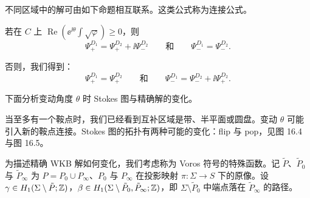 不同区域中的解可由如下命题相互联系。这类公式称为连接公式。

\begin{proposition}[16.21（{{[216, Thm. 2.25]}}）] 若在 $C$ 上 $\operatorname{Re}\left(\ee^{\ii\theta}\int\sqrt{\varphi}\right)\ge0$，则
\begin{equation}
\Psi^{D_1}_+=\Psi^{D_2}_++\ii\Psi^{D_2}_-\qquad\text{和}\qquad \Psi^{D_1}_-=\Psi^{D_2}_-.
\tag{16.25}
\end{equation}
\end{proposition}

否则，我们得到：
\begin{equation}
\Psi^{D_1}_+=\Psi^{D_2}_+\qquad\text{和}\qquad \Psi^{D_1}_-=\Psi^{D_2}_-+\ii\Psi^{D_2}_+.
\tag{16.26}
\end{equation}


下面分析变动角度 $\theta$ 时 Stokes 图与精确解的变化。

当至多有一个鞍点时，我们已经看到互补区域是带、半平面或圆盘。变动 $\theta$ 可能引入新的鞍点连接。Stokes 图的拓扑有两种可能的变化：flip 与 pop，见图 16.4 与图 16.5。



为描述精确 WKB 解如何变化，我们考虑称为 Voros 符号的特殊函数。记 $\tilde P$、$\tilde P_0$ 与 $\tilde P_\infty$ 为 $P=P_0\cup P_\infty$、$P_0$ 与 $P_\infty$ 在投影映射 $\pi:\Sigma\to S$ 下的原像。设 $\gamma\in H_1(\Sigma\setminus\tilde P;\mathbb{Z})$，$\beta\in H_1(\Sigma\setminus\tilde P_0,\tilde P_\infty;\mathbb{Z})$，即 $\Sigma\setminus\tilde P_0$ 中端点落在 $\tilde P_\infty$ 的路径。

